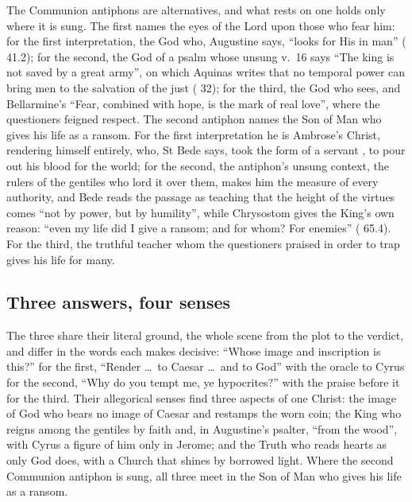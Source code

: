 The Communion antiphons are alternatives, and what rests on one holds only
where it is sung. The first names the eyes of the Lord upon those who fear him:
for the first interpretation, the God who, Augustine says, ``looks for His in
man'' ( 41.2); for the
second, the God of a psalm whose unsung v.~16 says ``The king is not saved by a
great army'', on which Aquinas writes that no temporal power can bring men to the
salvation of the just ( 32); for the third, the
God who sees, and Bellarmine's ``Fear, combined with
hope, is the mark of real love'', where the questioners feigned respect. The
second antiphon names the Son of Man who gives his life as a ransom. For the
first interpretation he is Ambrose's Christ, rendering himself entirely, who,
St Bede says, took the form of a servant , to pour out his blood for the world; for the
second, the antiphon's unsung context, the rulers of the gentiles who lord it
over them, makes him the measure of every authority, and Bede reads the passage
as teaching that the height of the virtues comes ``not by power, but by
humility'', while Chrysostom gives the King's own reason: ``even my life did I
give a ransom; and for whom? For enemies'' ( 65.4).
For the third, the truthful teacher whom the questioners praised in order to
trap gives his life for many.

\subsection{Three answers, four senses}

The three share their literal ground, the whole scene from the plot to the
verdict, and differ in the words each makes decisive: ``Whose image and
inscription is this?'' for the first, ``Render \ldots\ to Caesar \ldots\ and to
God'' with the oracle to Cyrus for the second, ``Why do you tempt me, ye
hypocrites?'' with the praise before it for the third. Their allegorical senses
find three aspects of one Christ: the image of God who bears no image of Caesar
and restamps the worn coin; the King who reigns among the gentiles by faith
and, in Augustine's psalter, ``from the wood'', with Cyrus a figure of him only
in Jerome; and the Truth who reads hearts as only God does, with a Church that
shines by borrowed light. Where the second Communion antiphon is sung, all
three meet in the Son of Man who gives his life as a ransom.

